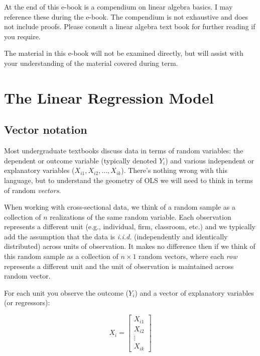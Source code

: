 \documentclass[
  letterpaper,
  DIV=11,
  numbers=noendperiod]{scrreprt}
\begin{document}
At the end of this e-book is a compendium on linear algebra basics. I
may reference these during the e-book. The compendium is not exhaustive
and does not include proofs. Please consult a linear algebra text book
for further reading if you require.

The material in this e-book will not be examined directly, but will
assist with your understanding of the material covered during term.


\hypertarget{the-linear-regression-model}{%
\chapter{The Linear Regression
Model}\label{the-linear-regression-model}}

\hypertarget{vector-notation}{%
\section{Vector notation}\label{vector-notation}}

Most undergraduate textbooks discuss data in terms of random variables:
the dependent or outcome variable (typically denoted \(Y_i\)) and
various independent or explanatory variables
(\(X_{i1},X_{i2},\ldots,X_{ik}\)). There's nothing wrong with this
language, but to understand the geometry of OLS we will need to think in
terms of random \emph{vectors}.

When working with cross-sectional data, we think of a random sample as a
collection of \(n\) realizations of the same random variable. Each
observation represents a different unit (e.g., individual, firm,
classroom, etc.) and we typically add the assumption that the data is
\emph{i.i.d.} (independently and identically distributed) across units
of observation. It makes no difference then if we think of this random
sample as a collection of \(n\times 1\) random vectors, where each
\emph{row} represents a different unit and the unit of observation is
maintained across random vector.

For each unit you observe the outcome (\(Y_i\)) and a vector of
explanatory variables (or regressors):

\[
X_i = \begin{bmatrix}X_{i1} \\ X_{i2} \\ \vdots \\ X_{ik}\end{bmatrix}
\]
\end{document}
